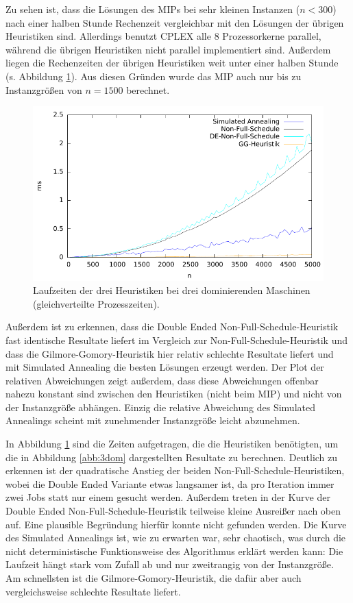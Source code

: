 \documentclass{scrreprt}
\begin{document}
Zu sehen ist, dass die Lösungen des MIPs bei sehr kleinen Instanzen ($n<300$) nach einer halben Stunde Rechenzeit vergleichbar mit den Lösungen der übrigen Heuristiken sind.
Allerdings benutzt CPLEX alle 8 Prozessorkerne parallel, während die übrigen Heuristiken nicht parallel implementiert sind.
Außerdem liegen die Rechenzeiten der übrigen Heuristiken weit unter einer halben Stunde (s. Abbildung \ref{abb:3domtime}).
Aus diesen Gründen wurde das MIP auch nur bis zu Instanzgrößen von $n=1500$ berechnet.
\begin{figure}
    \begin{center}
        \includegraphics[width=.8\textwidth]{../instances/3dom/plottime.pdf}
    \end{center}
    \caption{
        \label{abb:3domtime}
        Laufzeiten der drei Heuristiken bei drei dominierenden Maschinen (gleichverteilte Prozesszeiten).
    }
\end{figure}

Außerdem ist zu erkennen, dass die Double Ended Non-Full-Schedule-Heuristik fast identische Resultate liefert im Vergleich zur Non-Full-Schedule-Heuristik
und dass die Gilmore-Gomory-Heuristik hier relativ schlechte Resultate liefert und mit Simulated Annealing die besten Lösungen erzeugt werden.
Der Plot der relativen Abweichungen zeigt außerdem, dass diese Abweichungen offenbar nahezu konstant sind zwischen den Heuristiken (nicht beim MIP) 
und nicht von der Instanzgröße abhängen.
Einzig die relative Abweichung des Simulated Annealings scheint mit zunehmender Instanzgröße leicht abzunehmen.

In Abbildung \ref{abb:3domtime} sind die Zeiten aufgetragen, die die Heuristiken benötigten, um die in Abbildung \ref{abb:3dom} dargestellten Resultate zu berechnen.
Deutlich zu erkennen ist der quadratische Anstieg der beiden Non-Full-Schedule-Heuristiken, wobei die Double Ended Variante etwas langsamer ist,
da pro Iteration immer zwei Jobs statt nur einem gesucht werden.
Außerdem treten in der Kurve der Double Ended Non-Full-Schedule-Heuristik teilweise kleine Ausreißer nach oben auf.
Eine plausible Begründung hierfür konnte nicht gefunden werden.
Die Kurve des Simulated Annealings ist, wie zu erwarten war, sehr chaotisch, was durch die nicht deterministische Funktionsweise des Algorithmus erklärt werden kann:
Die Laufzeit hängt stark vom Zufall ab und nur zweitrangig von der Instanzgröße.
Am schnellsten ist die Gilmore-Gomory-Heuristik, die dafür aber auch vergleichsweise schlechte Resultate liefert.
\end{document}
